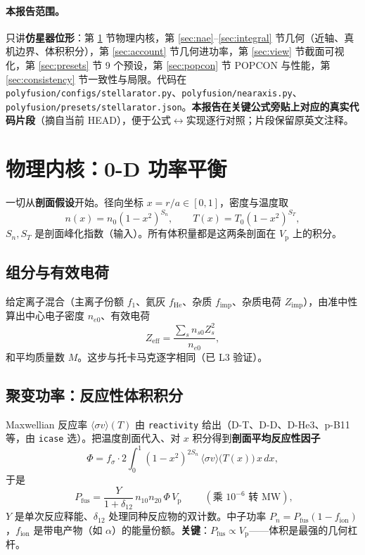 \documentclass[UTF8,11pt]{ctexart}
\newcommand{\Vp}{V_\mathrm{p}}
\newcommand{\Pfus}{P_\mathrm{fus}}
\begin{document}
\paragraph{本报告范围。}
只讲\textbf{仿星器位形}：第 \ref{sec:power} 节物理内核，第 \ref{sec:nae}--\ref{sec:integral} 节几何（近轴、真机边界、体积积分），第 \ref{sec:account} 节几何进功率，第 \ref{sec:view} 节截面可视化，第 \ref{sec:presets} 节 9 个预设，第 \ref{sec:popcon} 节 POPCON 与性能，第 \ref{sec:consistency} 节一致性与局限。代码在 \texttt{polyfusion/configs/stellarator.py}、\texttt{polyfusion/nearaxis.py}、\texttt{polyfusion/presets/stellarator.json}。\textbf{本报告在关键公式旁贴上对应的真实代码片段}（摘自当前 HEAD），便于公式$\leftrightarrow$实现逐行对照；片段保留原英文注释。

\section{物理内核：0-D 功率平衡}\label{sec:power}

一切从\textbf{剖面假设}开始。径向坐标 $x=r/a\in[0,1]$，密度与温度取
\begin{equation}
n(x)=n_0(1-x^2)^{S_n},\qquad T(x)=T_0(1-x^2)^{S_T},
\end{equation}
$S_n,S_T$ 是剖面峰化指数（输入）。所有体积量都是这两条剖面在 $\Vp$ 上的积分。

\subsection{组分与有效电荷}
给定离子混合（主离子份额 $f_1$、氦灰 $f_\mathrm{He}$、杂质 $f_\mathrm{imp}$、杂质电荷 $Z_\mathrm{imp}$），由准中性算出中心电子密度 $n_{e0}$、有效电荷
\[
Z_\mathrm{eff}=\frac{\sum_s n_{s0}Z_s^2}{n_{e0}},
\]
和平均质量数 $M$。这步与托卡马克逐字相同（已 L3 验证）。

\subsection{聚变功率：反应性体积积分}
Maxwellian 反应率 $\langle\sigma v\rangle(T)$ 由 \texttt{reactivity} 给出（D-T、D-D、D-He3、p-B11 等，由 \texttt{icase} 选）。把温度剖面代入、对 $x$ 积分得到\textbf{剖面平均反应性因子}
\begin{equation}
\Phi=f_\sigma\cdot 2\!\int_0^1 (1-x^2)^{2S_n}\,\langle\sigma v\rangle\!\big(T(x)\big)\,x\,dx,
\end{equation}
于是
\begin{equation}
\boxed{\;\Pfus=\frac{Y}{1+\delta_{12}}\,n_{10}n_{20}\,\Phi\,\Vp\;}\qquad(\text{乘 }10^{-6}\text{ 转 MW}),
\end{equation}
$Y$ 是单次反应释能、$\delta_{12}$ 处理同种反应物的双计数。中子功率 $P_n=\Pfus(1-f_\mathrm{ion})$，$f_\mathrm{ion}$ 是带电产物（如 $\alpha$）的能量份额。\textbf{关键}：$\Pfus\propto\Vp$——体积是最强的几何杠杆。
\end{document}
